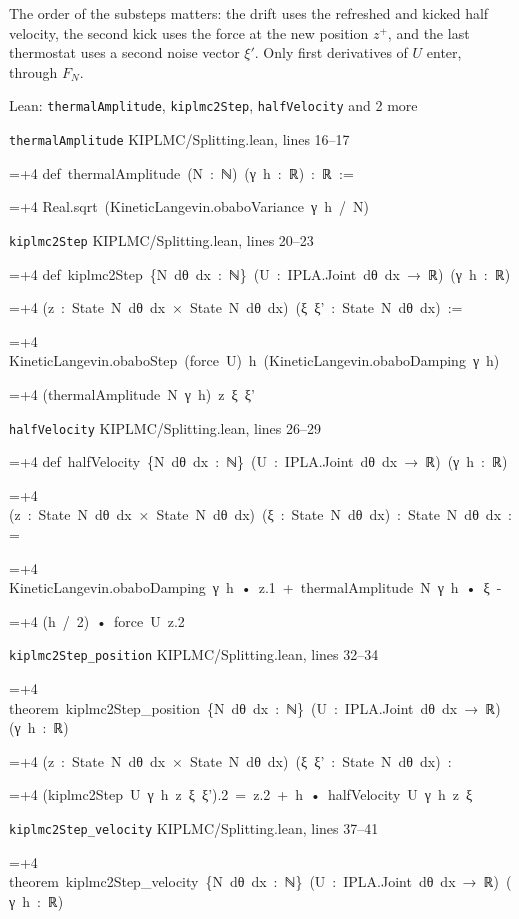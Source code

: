 \documentclass[11pt,a4paper]{article}
\newlength{\leancharwidth}
\newenvironment{leancode}{\par\smallskip\begingroup\ttfamily\footnotesize\raggedright
  \settowidth{\leancharwidth}{M}\setlength{\parskip}{0pt}\setlength{\parindent}{0pt}
  \frenchspacing}{\par\endgroup\smallskip}
\newcommand{\leanline}[2]{\hangindent=\dimexpr#1\leancharwidth+4\leancharwidth\relax
  \hangafter=1\noindent\hspace*{#1\leancharwidth}#2\par}
\newcommand{\leansource}[1]{\par{\footnotesize\color{leanmuted}#1}\par}
\begin{document}
The order of the substeps matters: the drift uses the refreshed and kicked half velocity, the second kick uses the force at the new position \(z^+\), and the last thermostat uses a second noise vector \(\xi'\). Only first derivatives of \(U\) enter, through \(F_N\).

\begin{leanbox}{Lean: \texttt{thermalAmplitude}, \texttt{kiplmc2Step}, \texttt{halfVelocity} and 2 more}
\leansource{\texttt{thermalAmplitude} \quad KIPLMC/\allowbreak{}Splitting.lean, lines 16–17}
\begin{leancode}
\leanline{0}{def\ thermalAmplitude\ (N\ :\ ℕ)\ (γ\ h\ :\ ℝ)\ :\ ℝ\ :=}
\leanline{2}{Real.sqrt\ (KineticLangevin.obaboVariance\ γ\ h\ /\ N)}
\end{leancode}
\leansource{\texttt{kiplmc2Step} \quad KIPLMC/\allowbreak{}Splitting.lean, lines 20–23}
\begin{leancode}
\leanline{0}{def\ kiplmc2Step\ \{N\ dθ\ dx\ :\ ℕ\}\ (U\ :\ IPLA.Joint\ dθ\ dx\ →\ ℝ)\ (γ\ h\ :\ ℝ)}
\leanline{4}{(z\ :\ State\ N\ dθ\ dx\ ×\ State\ N\ dθ\ dx)\ (ξ\ ξ'\ :\ State\ N\ dθ\ dx)\ :=}
\leanline{2}{KineticLangevin.obaboStep\ (force\ U)\ h\ (KineticLangevin.obaboDamping\ γ\ h)}
\leanline{4}{(thermalAmplitude\ N\ γ\ h)\ z\ ξ\ ξ'}
\end{leancode}
\leansource{\texttt{halfVelocity} \quad KIPLMC/\allowbreak{}Splitting.lean, lines 26–29}
\begin{leancode}
\leanline{0}{def\ halfVelocity\ \{N\ dθ\ dx\ :\ ℕ\}\ (U\ :\ IPLA.Joint\ dθ\ dx\ →\ ℝ)\ (γ\ h\ :\ ℝ)}
\leanline{4}{(z\ :\ State\ N\ dθ\ dx\ ×\ State\ N\ dθ\ dx)\ (ξ\ :\ State\ N\ dθ\ dx)\ :\ State\ N\ dθ\ dx\ :=}
\leanline{2}{KineticLangevin.obaboDamping\ γ\ h\ •\ z.1\ +\ thermalAmplitude\ N\ γ\ h\ •\ ξ\ -}
\leanline{4}{(h\ /\ 2)\ •\ force\ U\ z.2}
\end{leancode}
\leansource{\texttt{kiplmc2Step\_\allowbreak{}position} \quad KIPLMC/\allowbreak{}Splitting.lean, lines 32–34}
\begin{leancode}
\leanline{0}{theorem\ kiplmc2Step\_position\ \{N\ dθ\ dx\ :\ ℕ\}\ (U\ :\ IPLA.Joint\ dθ\ dx\ →\ ℝ)\ (γ\ h\ :\ ℝ)}
\leanline{4}{(z\ :\ State\ N\ dθ\ dx\ ×\ State\ N\ dθ\ dx)\ (ξ\ ξ'\ :\ State\ N\ dθ\ dx)\ :}
\leanline{4}{(kiplmc2Step\ U\ γ\ h\ z\ ξ\ ξ').2\ =\ z.2\ +\ h\ •\ halfVelocity\ U\ γ\ h\ z\ ξ}
\end{leancode}
\leansource{\texttt{kiplmc2Step\_\allowbreak{}velocity} \quad KIPLMC/\allowbreak{}Splitting.lean, lines 37–41}
\begin{leancode}
\leanline{0}{theorem\ kiplmc2Step\_velocity\ \{N\ dθ\ dx\ :\ ℕ\}\ (U\ :\ IPLA.Joint\ dθ\ dx\ →\ ℝ)\ (γ\ h\ :\ ℝ)}

\end{leancode}
\end{leanbox}
\end{document}
